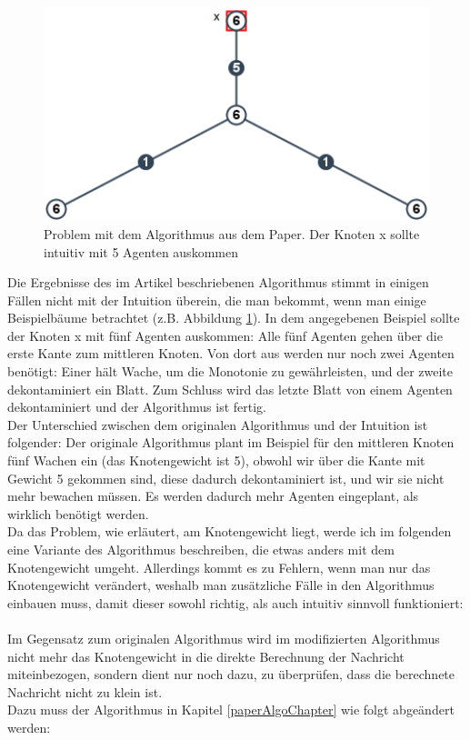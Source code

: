 	\begin{figure}
		\begin{center}
			\includegraphics[width=1\textwidth]{bilder/abb_paper_problem.png}
		\end{center}
		\caption{Problem mit dem Algorithmus aus dem Paper. Der Knoten x sollte intuitiv mit 5 Agenten auskommen}
		\label{fig:negBeispielPaperAlgo}
	\end{figure}

Die Ergebnisse des im Artikel beschriebenen Algorithmus stimmt in einigen Fällen nicht mit der Intuition überein, die man bekommt, wenn man einige Beispielbäume betrachtet (z.B. Abbildung \ref{fig:negBeispielPaperAlgo}). In dem  angegebenen Beispiel sollte der Knoten x mit fünf Agenten auskommen: Alle fünf Agenten gehen über die erste Kante zum mittleren Knoten. Von dort aus werden nur noch zwei Agenten benötigt: Einer hält Wache, um die Monotonie zu gewährleisten, und der zweite dekontaminiert ein Blatt. Zum Schluss wird das letzte Blatt von einem Agenten dekontaminiert und der Algorithmus ist fertig.
\\
Der Unterschied zwischen dem originalen Algorithmus und der Intuition ist folgender: Der originale Algorithmus plant im Beispiel für den mittleren Knoten fünf Wachen ein (das Knotengewicht ist 5), obwohl wir über die Kante mit Gewicht 5 gekommen sind, diese dadurch dekontaminiert ist, und wir sie nicht mehr bewachen müssen. Es werden dadurch mehr Agenten eingeplant, als wirklich benötigt werden.
\\
Da das Problem, wie erläutert, am Knotengewicht liegt, werde ich im folgenden eine Variante des Algorithmus beschreiben, die etwas anders mit dem Knotengewicht umgeht. Allerdings kommt es zu Fehlern, wenn man nur das Knotengewicht verändert, weshalb man zusätzliche Fälle in den Algorithmus einbauen muss, damit dieser sowohl richtig, als auch intuitiv sinnvoll funktioniert:
\\
\\
Im Gegensatz zum originalen Algorithmus wird im modifizierten Algorithmus nicht mehr das Knotengewicht in die direkte Berechnung der Nachricht miteinbezogen, sondern dient nur noch dazu, zu überprüfen, dass die berechnete Nachricht nicht zu klein ist.
\\
Dazu muss der Algorithmus in Kapitel \ref{paperAlgoChapter} wie folgt abgeändert werden:

